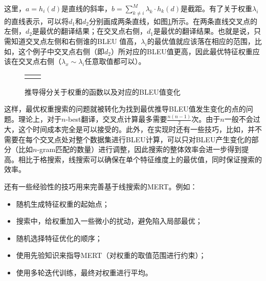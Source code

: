 \parinterval 这里，$a = h_i(d)$是直线的斜率，$b = \sum_{k \neq i}^{M} \lambda_k \cdot h_k (d)$是截距。有了关于权重$\lambda_i$的直线表示，可以将$d_1$和$d_2$分别画成两条直线，如图\ref{fig:4-25}所示。在两条直线交叉点的左侧，$d_2$是最优的翻译结果；在交叉点右侧，$d_1$是最优的翻译结果。也就是说，只需知道交叉点左侧和右侧谁的BLEU 值高，$\lambda_i$的最优值就应该落在相应的范围，比如，这个例子中交叉点右侧（即$d_2$）所对应的BLEU值更高，因此最优特征权重应该在交叉点右侧（$\lambda_x \sim \lambda_i$任意取值都可以）。

\begin{figure}[htp]
\centering
\begin{tabular}{l l}
\subfigure{} &  \subfigure{} \\
\end{tabular}
\caption{推导得分关于权重的函数以及对应的BLEU值变化}
\label{fig:4-25}
\end{figure}

\parinterval 这样，最优权重搜索的问题就被转化为找到最优推导BLEU值发生变化的点的问题。理论上，对于$n$-best翻译，交叉点计算最多需要$\frac{n(n-1)}{2}$次。由于$n$一般不会过大，这个时间成本完全是可以接受的。此外，在实现时还有一些技巧，比如，并不需要在每个交叉点处对整个数据集进行BLEU计算，可以只对BLEU产生变化的部分（比如$n$-gram匹配的数量）进行调整，因此搜索的整体效率会进一步得到提高。相比于格搜索，线搜索可以确保在单个特征维度上的最优值，同时保证搜索的效率。

\parinterval 还有一些经验性的技巧用来完善基于线搜索的MERT。例如：

\begin{itemize}
\vspace{0.5em}
\item 随机生成特征权重的起始点；
\vspace{0.5em}
\item 搜索中，给权重加入一些微小的扰动，避免陷入局部最优；
\vspace{0.5em}
\item 随机选择特征优化的顺序；
\vspace{0.5em}
\item 使用先验知识来指导MERT（对权重的取值范围进行约束）；
\vspace{0.5em}
\item 使用多轮迭代训练，最终对权重进行平均。
\vspace{0.5em}
\end{itemize}

